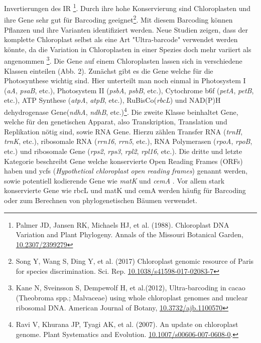 \documentclass{scrartcl}
\begin{document}
Invertierungen des IR \footnote{Palmer JD, Jansen RK, Michaels HJ, et al. (1988).  Chloroplast DNA Variation and Plant Phylogeny. Annals of the Missouri Botanical Garden,  \url{10.2307/2399279}}. Durch ihre hohe Konservierung sind Chloroplasten und ihre Gene sehr gut für Barcoding geeignet\footnote{Song Y, Wang S, Ding Y, et al. (2017) Chloroplast genomic resource of Paris for species discrimination. Sci. Rep. \url{10.1038/s41598-017-02083-7}}. Mit diesem
Barcoding können Pflanzen und ihre Varianten identifiziert werden. Neue Studien zeigen, dass der komplette Chloroplast selbst als eine Art "Ultra-barcode"
verwendet werden könnte, da die Variation in Chloroplasten in einer Spezies doch mehr variiert als angenommen \footnote{Kane N, Sveinsson S, Dempewolf H, et al.(2012), Ultra-barcoding in cacao (Theobroma spp.; Malvaceae) using whole chloroplast genomes and nuclear ribosomal DNA. American Journal of Botany, \url{10.3732/ajb.1100570}}. 
Die Gene auf einem Chloroplasten lassen sich in verschiedene Klassen einteilen (Abb. 2). Zunächst gibt es die Gene welche für die Photosynthese wichtig sind.
Hier unterteilt man noch einmal in Photosystem I (\emph{aA}, \emph{psaB}, etc.), Photosystem II (\emph{psbA}, \emph{psbB}, etc.), Cytochrome b6f (\emph{petA}, \emph{petB}, etc.), 
ATP Synthese (\emph{atpA}, \emph{atpB}, etc.), RuBisCo(\emph{rbcL}) und NAD(P)H dehydrogenase Gene(\emph{ndhA}, \emph{ndhB}, etc.)\footnote{Ravi V, Khurana JP, Tyagi AK, et al. (2007). An update on chloroplast genome. Plant Systematics and Evolution. \url{10.1007/s00606-007-0608-0}.}. Die zweite Klasse beinhaltet Gene, welche für den
genetischen Apparat, also Transkription, Translation und Replikation nötig sind, sowie RNA Gene. Hierzu zählen Transfer RNA (\emph{trnH}, \emph{trnK}, etc.), ribosomale RNA (\emph{rrn16}, \emph{rrn5}, etc.), 
RNA Polymerasen (\emph{rpoA}, \emph{rpoB}, etc.) und ribosomale Gene (\emph{rps2}, \emph{rps3}, \emph{rpl2}, \emph{rpl16}, etc.). Die dritte und letzte Kategorie beschreibt Gene welche konservierte Open Reading Frames (ORFs) haben und
ycfs (\emph{Hypothetical chloroplast open reading frames}) genannt werden, sowie potentiell kodierende Gene wie \emph{matK} und \emph{cemA} \footnotemark[12]{}. Vor allem stark konservierte Gene wie rbcL und matK und cemA werden 
häufig für Barcoding oder zum Berechnen von phylogenetischen Bäumen verwendet.
\end{document}
